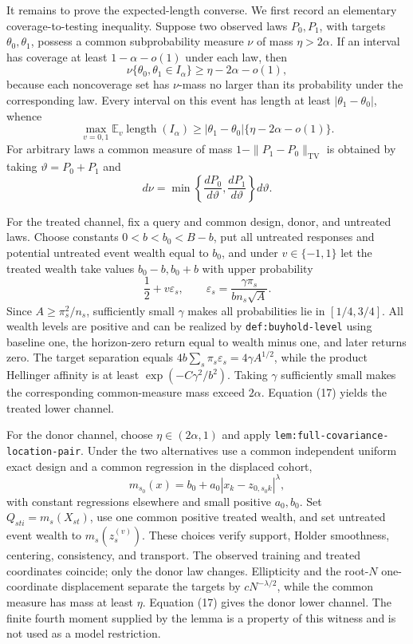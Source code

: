 It remains to prove the expected-length converse.  We first record an elementary coverage-to-testing inequality.  Suppose two observed laws \(P_0,P_1\), with targets \(\theta_0,\theta_1\), possess a common subprobability measure \(\nu\) of mass \(\eta>2\alpha\).  If an interval has coverage at least \(1-\alpha-o(1)\) under each law, then
\[
 \nu\{\theta_0,\theta_1\in I_\alpha\}
 \ge\eta-2\alpha-o(1),                                    \tag{16}
\]
because each noncoverage set has \(\nu\)-mass no larger than its probability under the corresponding law.  Every interval on this event has length at least \(|\theta_1-\theta_0|\), whence
\[
 \max_{v=0,1}\mathbb E_v\operatorname{length}(I_\alpha)
 \ge |\theta_1-\theta_0|\{\eta-2\alpha-o(1)\}.           \tag{17}
\]
For arbitrary laws a common measure of mass
\(1-\|P_1-P_0\|_{\mathrm{TV}}\) is obtained by taking
\(\vartheta=P_0+P_1\) and
\[
 d\nu=\min\left\{\frac{dP_0}{d\vartheta},
                    \frac{dP_1}{d\vartheta}\right\}
 d\vartheta.                                                \tag{18}
\]

For the treated channel, fix a query and common design, donor, and untreated laws.  Choose constants \(0<b<b_0<B-b\), put all untreated responses and potential untreated event wealth equal to \(b_0\), and under \(v\in\{-1,1\}\) let the treated wealth take values \(b_0-b,b_0+b\) with upper probability
\[
 \frac12+v\varepsilon_s,
 \qquad
 \varepsilon_s=\frac{\gamma\pi_s}{bn_s\sqrt A}.            \tag{19}
\]
Since \(A\ge\pi_s^2/n_s\), sufficiently small \(\gamma\) makes all probabilities lie in \([1/4,3/4]\).  All wealth levels are positive and can be realized by \texttt{def:buyhold-level} using baseline one, the horizon-zero return equal to wealth minus one, and later returns zero.  The target separation equals
\(4b\sum_s\pi_s\varepsilon_s=4\gamma A^{1/2}\), while the product Hellinger affinity is at least
\(\exp(-C\gamma^2/b^2)\).  Taking \(\gamma\) sufficiently small makes the corresponding common-measure mass exceed \(2\alpha\).  Equation (17) yields the treated lower channel.

For the donor channel, choose \(\eta\in(2\alpha,1)\) and apply \texttt{lem:full-covariance-location-pair}.  Under the two alternatives use a common independent uniform exact design and a common regression in the displaced cohort,
\[
 m_{s_0}(x)=b_0+a_0|x_k-z_{0,s_0k}|^\lambda,               \tag{20}
\]
with constant regressions elsewhere and small positive \(a_0,b_0\).  Set \(Q_{sti}=m_s(X_{st})\), use one common positive treated wealth, and set untreated event wealth to \(m_s(z_s^{(v)})\).  These choices verify support, Holder smoothness, centering, consistency, and transport.  The observed training and treated coordinates coincide; only the donor law changes.  Ellipticity and the root-\(N\) one-coordinate displacement separate the targets by \(cN^{-\lambda/2}\), while the common measure has mass at least \(\eta\).  Equation (17) gives the donor lower channel.  The finite fourth moment supplied by the lemma is a property of this witness and is not used as a model restriction.


